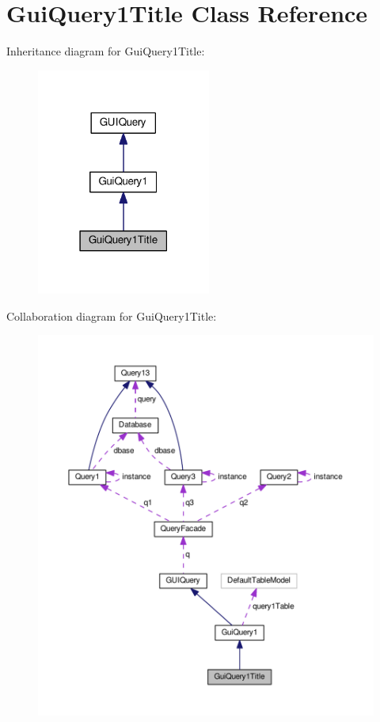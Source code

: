 \hypertarget{classGuiQuery1Title}{}\section{Gui\+Query1\+Title Class Reference}
\label{classGuiQuery1Title}


Inheritance diagram for Gui\+Query1\+Title\+:\nopagebreak
\begin{figure}[H]
\begin{center}
\leavevmode
\includegraphics[width=162pt]{classGuiQuery1Title__inherit__graph}
\end{center}
\end{figure}


Collaboration diagram for Gui\+Query1\+Title\+:\nopagebreak
\begin{figure}[H]
\begin{center}
\leavevmode
\includegraphics[width=350pt]{classGuiQuery1Title__coll__graph}
\end{center}
\end{figure}
